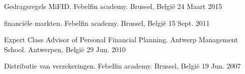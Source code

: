 


\begin{cventries}


\cventry
{Gedragsregels MiFID.} %
{Febelfin academy.} %
{Brussel, België} %
{24 Maart 2015} %
{ %
}



\cventry
{financiële markten.} %
{Febelfin academy.} %
{Brussel, België} %
{15 Sept. 2011} %
{ %
}

\cventry
{Expert Class Advisor of Personal Financial Planning.} %
{Antwerp Management School.} %
{Antwerpen, België} %
{29 Jun. 2010} %
{ %
}

\cventry
{Distributie van verzekeringen.} %
{Febelfin academy.} %
{Brussel, België} %
{19 Jun. 2007} %
{ %
}





\end{cventries}
